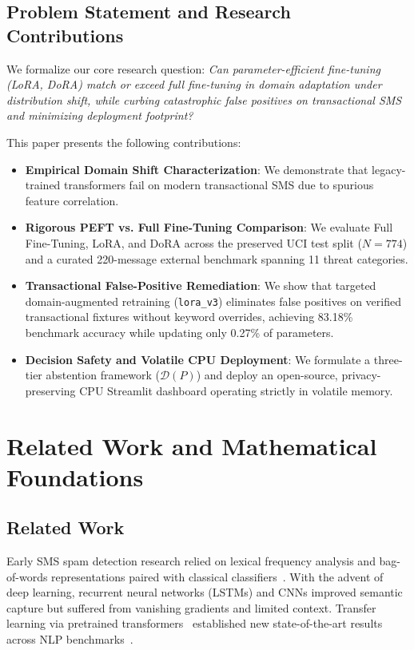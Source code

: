 \documentclass[conference]{IEEEtran}
\begin{document}
\subsection{Problem Statement and Research Contributions}
We formalize our core research question: \textit{Can parameter-efficient fine-tuning (LoRA, DoRA) match or exceed full fine-tuning in domain adaptation under distribution shift, while curbing catastrophic false positives on transactional SMS and minimizing deployment footprint?}

This paper presents the following contributions:
\begin{itemize}
    \item \textbf{Empirical Domain Shift Characterization}: We demonstrate that legacy-trained transformers fail on modern transactional SMS due to spurious feature correlation.
    \item \textbf{Rigorous PEFT vs. Full Fine-Tuning Comparison}: We evaluate Full Fine-Tuning, LoRA, and DoRA across the preserved UCI test split ($N=774$) and a curated 220-message external benchmark spanning 11 threat categories.
    \item \textbf{Transactional False-Positive Remediation}: We show that targeted domain-augmented retraining (\texttt{lora\_v3}) eliminates false positives on verified transactional fixtures without keyword overrides, achieving 83.18\% benchmark accuracy while updating only 0.27\% of parameters.
    \item \textbf{Decision Safety and Volatile CPU Deployment}: We formulate a three-tier abstention framework ($\mathcal{D}(P)$) and deploy an open-source, privacy-preserving CPU Streamlit dashboard operating strictly in volatile memory.
\end{itemize}

\section{Related Work and Mathematical Foundations}
\label{sec:methodology}

\subsection{Related Work}
Early SMS spam detection research relied on lexical frequency analysis and bag-of-words representations paired with classical classifiers~\cite{almeida2011sms,delany2012sms}. With the advent of deep learning, recurrent neural networks (LSTMs) and CNNs improved semantic capture but suffered from vanishing gradients and limited context. Transfer learning via pretrained transformers~\cite{devlin2019bert} established new state-of-the-art results across NLP benchmarks~\cite{wang2018glue}.
\end{document}
